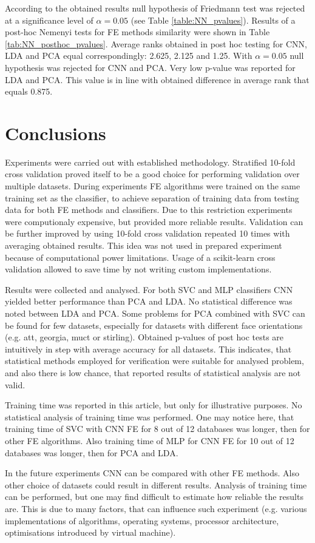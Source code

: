 \documentclass[a4paper, 10 pt, journal]{ieeeconf}
\begin{document}
\newpage

According to the obtained results null hypothesis of Friedmann test was rejected at a significance level of $\alpha = 0.05$ (see Table \ref{table:NN_pvalues}). 
Results of a post-hoc Nemenyi tests for FE methods similarity were shown in Table \ref{tab:NN_posthoc_pvalues}. 
Average ranks obtained in post hoc testing for CNN, LDA and PCA equal correspondingly: 2.625, 2.125 and 1.25.
With $\alpha = 0.05$ null hypothesis was rejected for CNN and PCA.
Very low p-value was reported for LDA and PCA. This value is in line with obtained difference in average rank that equals 0.875.

\newpage


\section{Conclusions}

Experiments were carried out with established methodology. Stratified 10-fold cross validation proved itself to be a good choice for performing validation over multiple datasets. During experiments FE algorithms were trained on the same training set as the classifier, to achieve separation of training data from testing data for both FE methods and classifiers. Due to this restriction experiments were computionaly expensive, but provided more reliable results. Validation can be further improved by using 10-fold cross validation repeated 10 times with averaging obtained results. This idea was not used in prepared experiment because of computational power limitations. Usage of a scikit-learn cross validation allowed to save time by not writing custom implementations.

Results were collected and analysed. For both SVC and MLP classifiers CNN yielded better performance than PCA and LDA. No statistical difference was noted between LDA and PCA. Some problems for PCA combined with SVC can be found for few datasets, especially for datasets with different face orientations (e.g. att, georgia, muct or stirling). Obtained p-values of post hoc tests are intuitively in step with average accuracy for all datasets. This indicates, that statistical methods employed for verification were suitable for analysed problem, and also there is low chance, that reported results of statistical analysis are not valid.

Training time was reported in this article, but only for illustrative purposes. No statistical analysis of training time was performed. One may notice here, that training time of SVC with CNN FE for 8 out of 12 databases was longer, then for other FE algorithms. Also training time of MLP for CNN FE for 10 out of 12 databases was longer, then for PCA and LDA.

In the future experiments CNN can be compared with other FE methods. Also other choice of datasets could result in different results. Analysis of training time can be performed, but one may find difficult to estimate how reliable the results are. This is due to many factors, that can influence such experiment (e.g. various implementations of algorithms, operating systems, processor architecture, optimisations introduced by virtual machine). 




\end{document}
